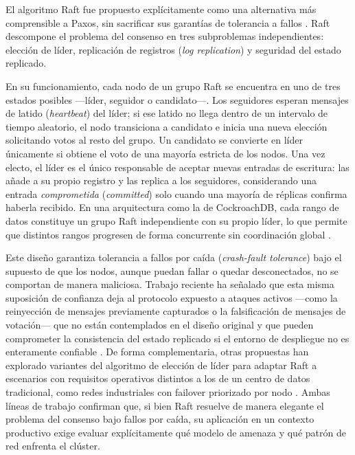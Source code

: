 \documentclass[12pt]{article}
\begin{document}
    El algoritmo Raft fue propuesto explícitamente como una alternativa más comprensible a Paxos, sin sacrificar sus garantías de tolerancia a fallos \parencite{ongaro2014raft}. Raft descompone el problema del consenso en tres subproblemas independientes: elección de líder, replicación de registros (\emph{log replication}) y seguridad del estado replicado.

    En su funcionamiento, cada nodo de un grupo Raft se encuentra en uno de tres estados posibles —líder, seguidor o candidato—. Los seguidores esperan mensajes de latido (\emph{heartbeat}) del líder; si ese latido no llega dentro de un intervalo de tiempo aleatorio, el nodo transiciona a candidato e inicia una nueva elección solicitando votos al resto del grupo. Un candidato se convierte en líder únicamente si obtiene el voto de una mayoría estricta de los nodos. Una vez electo, el líder es el único responsable de aceptar nuevas entradas de escritura: las añade a su propio registro y las replica a los seguidores, considerando una entrada \emph{comprometida} (\emph{committed}) solo cuando una mayoría de réplicas confirma haberla recibido. En una arquitectura como la de CockroachDB, cada rango de datos constituye un grupo Raft independiente con su propio líder, lo que permite que distintos rangos progresen de forma concurrente sin coordinación global \parencite{taft2020cockroachdb}.

    Este diseño garantiza tolerancia a fallos por caída (\emph{crash-fault tolerance}) bajo el supuesto de que los nodos, aunque puedan fallar o quedar desconectados, no se comportan de manera maliciosa. Trabajo reciente ha señalado que esta misma suposición de confianza deja al protocolo expuesto a ataques activos —como la reinyección de mensajes previamente capturados o la falsificación de mensajes de votación— que no están contemplados en el diseño original y que pueden comprometer la consistencia del estado replicado si el entorno de despliegue no es enteramente confiable \parencite{afifi2025consensus}. De forma complementaria, otras propuestas han explorado variantes del algoritmo de elección de líder para adaptar Raft a escenarios con requisitos operativos distintos a los de un centro de datos tradicional, como redes industriales con failover priorizado por nodo \parencite{wu2024raft}. Ambas líneas de trabajo confirman que, si bien Raft resuelve de manera elegante el problema del consenso bajo fallos por caída, su aplicación en un contexto productivo exige evaluar explícitamente qué modelo de amenaza y qué patrón de red enfrenta el clúster.
\end{document}
